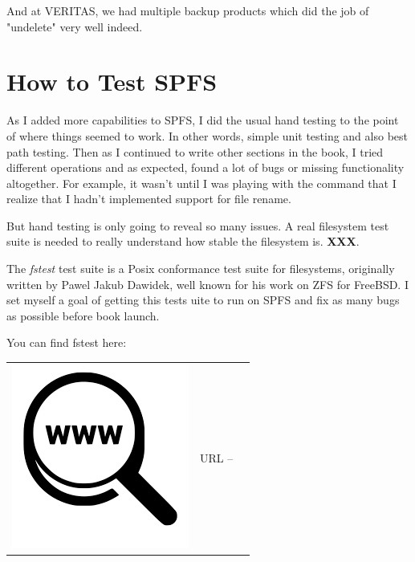 And at VERITAS, we had multiple backup products which did the job of "undelete" very well indeed.


\section{How to Test SPFS}

As I added more capabilities to SPFS, I did the usual hand testing to the point of where things seemed to work. In other words, simple unit testing and also best path testing. Then as I continued to write other sections in the book, I tried different operations and as expected, found a lot of bugs or missing functionality altogether. For example, it wasn't until I was playing with the  command that I realize that I hadn't implemented support for file rename. 

But hand testing is only going to reveal so many issues. A real filesystem test suite is needed to really understand how stable the filesystem is. \textbf{XXX}.


The \textit{fstest} test suite is a Posix conformance test suite for filesystems, originally written by Pawel Jakub Dawidek, well known for his work on ZFS for FreeBSD. I set myself a goal of getting this tests uite to run on SPFS and fix as many bugs as possible before book launch.

You can find fstest here:

\begin{table}[h]
\begin{tabular}{lcl}
\parbox[r]{0.5in}{\includegraphics[scale=0.15]{figures/url.png}} & \parbox[l]{0.55in}{URL  -- } & \parbox[l]{3in}{}
\end{tabular}
\end{table}

